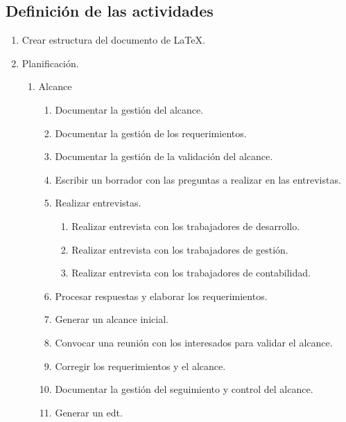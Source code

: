 \subsection{Definición de las actividades}
\begin{enumerate}

 \scriptsize
  \item Crear estructura del documento de \LaTeX .
  \item Planificación.

  \begin{enumerate}

    \item Alcance

    \begin{enumerate}

      \item Documentar la gestión del alcance.
      \item Documentar la gestión de los requerimientos.
      \item Documentar la gestión de la validación del alcance.
      \item Escribir un borrador con las preguntas a realizar en las
        entrevistas.
      \item Realizar entrevistas.

      \begin{enumerate}

        \item Realizar entrevista con los trabajadores de desarrollo.
        \item Realizar entrevista con los trabajadores de gestión.
        \item Realizar entrevista con los trabajadores de contabilidad.

      \end{enumerate}

      \item Procesar respuestas y elaborar los requerimientos.
      \item Generar un alcance inicial.
      \item Convocar una reunión con los interesados para validar el alcance.
      \item Corregir los requerimientos y el alcance.
      \item Documentar la gestión del seguimiento y control del alcance.
      \item Generar un \gls{edt}.

    \end{enumerate}


\end{enumerate}
\end{enumerate}
